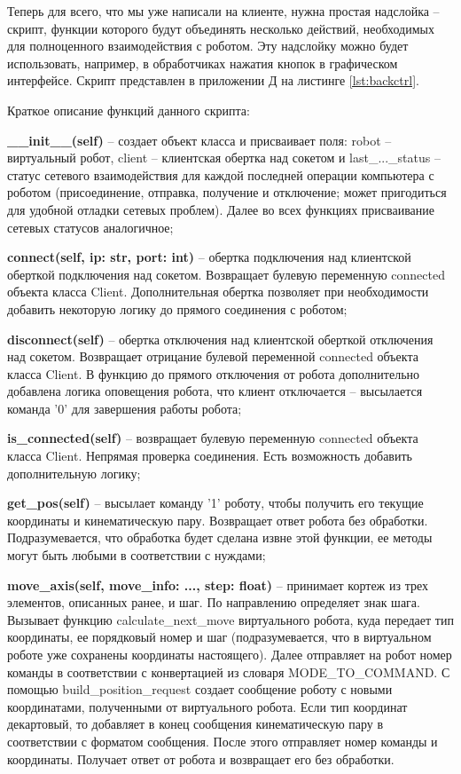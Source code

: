 \documentclass[a4paper,14pt]{extarticle}
\begin{document}
Теперь для всего, что мы уже написали на клиенте, нужна простая надслойка -- скрипт,
функции которого будут объединять несколько действий, необходимых для полноценного взаимодействия
с роботом. Эту надслойку можно будет использовать, например, в обработчиках нажатия кнопок в графическом интерфейсе.
Скрипт представлен в приложении Д на листинге \ref{lst:backctrl}.


Краткое описание функций данного скрипта:
\begin{compactitem}
    \item \textbf{\_\_init\_\_(self)} -- создает объект класса и
    присваивает поля: robot -- виртуальный робот, client -- клиентская
    обертка над сокетом и last\_...\_status -- статус сетевого взаимодействия для каждой
    последней операции компьютера с роботом (присоединение, отправка, получение и отключение;
    может пригодиться для удобной отладки сетевых проблем). Далее во всех функциях присваивание
    сетевых статусов аналогичное;
    \item \textbf{connect(self, ip: str, port: int)} -- обертка подключения над клиентской
    оберткой подключения над сокетом. Возвращает булевую переменную connected объекта класса Client.
    Дополнительная обертка позволяет при необходимости добавить некоторую
    логику до прямого соединения с роботом;
    \item \textbf{disconnect(self)} -- обертка отключения над клиентской
    оберткой отключения над сокетом. Возвращает отрицание булевой переменной connected объекта класса Client.
    В функцию до прямого отключения от робота дополнительно добавлена логика оповещения робота,
    что клиент отключается -- высылается команда '0' для завершения работы робота;
    \item \textbf{is\_connected(self)} -- возвращает булевую переменную connected объекта класса Client.
    Непрямая проверка соединения. Есть возможность добавить дополнительную логику;
    \item \textbf{get\_pos(self)} -- высылает команду '1' роботу, чтобы получить
    его текущие координаты и кинематическую пару. Возвращает ответ робота без обработки.
    Подразумевается, что обработка будет сделана извне этой функции, ее методы могут быть любыми
    в соответствии с нуждами;
    \item \textbf{move\_axis(self, move\_info: ..., step: float)} -- принимает кортеж
    из трех элементов, описанных ранее, и шаг. По направлению определяет знак шага.
    Вызывает функцию calculate\_next\_move виртуального робота, куда передает тип координаты,
    ее порядковый номер и шаг (подразумевается, что в виртуальном роботе уже сохранены координаты
    настоящего). Далее отправляет на робот номер команды в соответствии
    с конвертацией из словаря MODE\_TO\_COMMAND. С помощью build\_position\_request
    создает сообщение роботу с новыми координатами, полученными от виртуального робота.
    Если тип координат декартовый, то добавляет в конец сообщения кинематическую пару
    в соответствии с форматом сообщения. После этого отправляет номер команды и координаты.
    Получает ответ от робота и возвращает его без обработки.
\end{compactitem}
\end{document}
